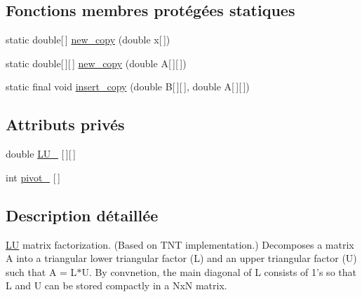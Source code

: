 \subsection*{Fonctions membres protégées statiques}
\begin{DoxyCompactItemize}
\item 
static double\mbox{[}$\,$\mbox{]} \hyperlink{classjnt_1_1scimark2_1_1LU_ac6ac7f9988effe1c32b41fe0266c7b1a}{new\-\_\-copy} (double x\mbox{[}$\,$\mbox{]})
\item 
static double\mbox{[}$\,$\mbox{]}\mbox{[}$\,$\mbox{]} \hyperlink{classjnt_1_1scimark2_1_1LU_a6f20970aaee1daa72f7d91d890a58e3e}{new\-\_\-copy} (double A\mbox{[}$\,$\mbox{]}\mbox{[}$\,$\mbox{]})
\item 
static final void \hyperlink{classjnt_1_1scimark2_1_1LU_a9ba5aba559ddafbf12165e0e2b9039c5}{insert\-\_\-copy} (double B\mbox{[}$\,$\mbox{]}\mbox{[}$\,$\mbox{]}, double A\mbox{[}$\,$\mbox{]}\mbox{[}$\,$\mbox{]})
\end{DoxyCompactItemize}
\subsection*{Attributs privés}
\begin{DoxyCompactItemize}
\item 
double \hyperlink{classjnt_1_1scimark2_1_1LU_aadbf22a0977a898fe04bb4814a7d3d6b}{L\-U\-\_\-} \mbox{[}$\,$\mbox{]}\mbox{[}$\,$\mbox{]}
\item 
int \hyperlink{classjnt_1_1scimark2_1_1LU_abd99a699a532c831c657988d297a5aee}{pivot\-\_\-} \mbox{[}$\,$\mbox{]}
\end{DoxyCompactItemize}


\subsection{Description détaillée}
\hyperlink{classjnt_1_1scimark2_1_1LU}{L\-U} matrix factorization. (Based on T\-N\-T implementation.) Decomposes a matrix A into a triangular lower triangular factor (L) and an upper triangular factor (U) such that A = L$\ast$\-U. By convnetion, the main diagonal of L consists of 1's so that L and U can be stored compactly in a Nx\-N matrix. 

